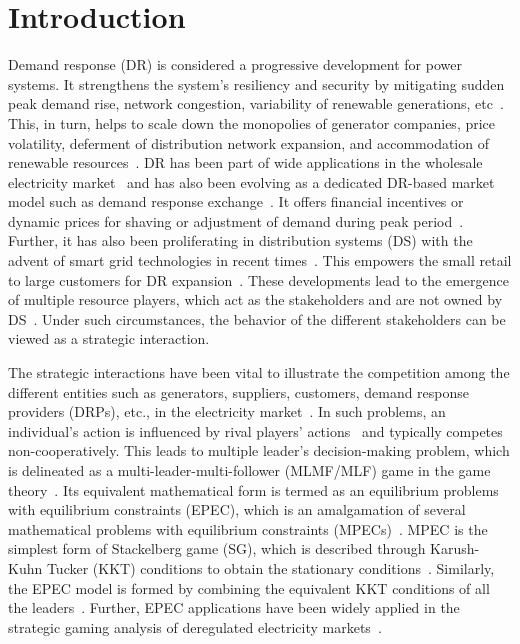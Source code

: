 \documentclass[journal]{IEEEtran}
\begin{document}
\section{Introduction}
Demand response (DR) is considered a progressive development for   power systems. It strengthens the system’s resiliency and security by mitigating sudden peak demand rise, network congestion, variability of renewable generations, etc~\cite{schweppe2013spot}. This, in turn, helps to scale down the monopolies of generator companies, price volatility, deferment of distribution network expansion, and accommodation of renewable resources~\cite{schweppe2013spot}. DR has been part of wide applications in the wholesale electricity market~\cite{kirschen2000factoring} and has also been evolving as a dedicated DR-based market model such as demand response exchange~\cite{nguyen2010pool}. It offers financial incentives or dynamic prices for shaving or adjustment of demand during peak period~\cite{qdr2006benefits}. Further, it has also been proliferating in distribution systems (DS) with the advent of smart grid technologies in recent times~\cite{kirschen2000factoring}. This empowers the small retail to large customers for DR expansion~\cite{boroumand2015electricity,song2017price}. These developments lead to the emergence of multiple resource players, which act as the stakeholders and are not owned by DS~\cite{algarni2009generic,haider2020toward}. Under such circumstances, the behavior of the different stakeholders can be viewed as a strategic interaction. 

The strategic interactions have been vital to illustrate the competition among the different entities such as generators, suppliers, customers, demand response providers (DRPs), etc., in the electricity market~\cite{bautista2007formulation,hobbs2000strategic,cardell1997market}. In such problems, an individual’s action is influenced by rival players' actions~\cite{su2004sequential} and typically competes non-cooperatively. This leads to multiple leader’s decision-making problem, which is delineated as a multi-leader-multi-follower (MLMF/MLF) game in the game theory~\cite{bautista2007formulation,leyffer2010solving}. Its equivalent mathematical form is termed as an equilibrium problems with equilibrium constraints (EPEC), which is an amalgamation of several mathematical problems with equilibrium constraints (MPECs)~\mbox{\cite{su2004sequential}.} MPEC is the simplest form of Stackelberg game (SG), which is described through Karush-Kuhn Tucker (KKT) conditions to obtain the stationary conditions~\cite{de2003stackelberg}. Similarly, the EPEC model is formed by combining the equivalent KKT conditions of all the leaders~\cite{su2004sequential}. Further, EPEC applications have been widely applied in the strategic gaming analysis of deregulated electricity markets~\cite{su2004sequential, bautista2007formulation}. 
\end{document}

